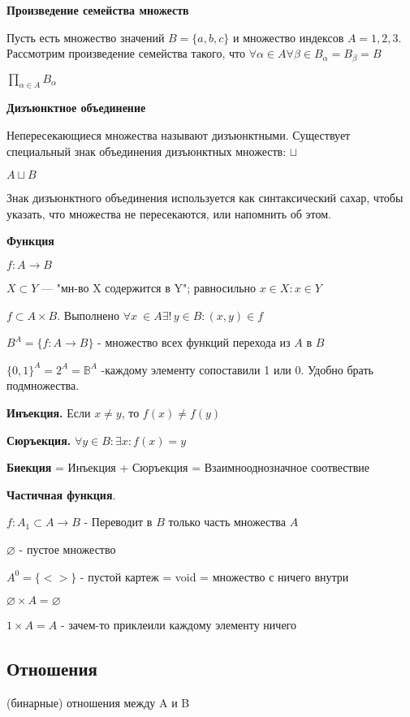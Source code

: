 \textbf{Произведение семейства множеств}

Пусть есть множество значений $B = \{a, b, c\}$  и множество индексов $A = {1, 2, 3}$. Рассмотрим произведение семейства такого, что $\forall \alpha \in A \forall \beta \in B_\alpha = B_\beta = B$

$\prod_{\alpha\in A}{B_\alpha}$

\textbf{Дизъюнктное объединение}

Непересекающиеся множества называют дизъюнктными. Существует специальный знак объединения дизъюнктных множеств: $\sqcup$ 

$A \sqcup B$

Знак дизъюнктного объединения используется как синтаксический сахар, чтобы указать, что множества не пересекаются, или напомнить об этом.

\textbf{Функция} 

$f:A \rightarrow B$

$X \subset Y$ --- "мн-во X содержится в Y"; равносильно $x \in X: x \in Y$

$f \subset A \times B$. Выполнено $\forall x\ \in A \exists!\,y \in B: (x,y) \in f$

$B^A = \{f:A \rightarrow B\}$ - множество всех функций перехода из $A$ в $B$

$\{0, 1\}^{A}=2^{A}=\mathbb{B}^{A}$ -каждому элементу сопоставили 1 или 0. Удобно брать подмножества.


\textbf{Инъекция.} Если $x \neq y$, то $f(x) \neq f(y)$

\textbf{Сюръекция.} $\forall y \in B: \exists x: f(x)=y$

\textbf{Биекция} = Инъекция + Сюръекция = Взаимнооднозначное соотвествие

\textbf{Частичная функция}. 

$f: A_1 \subset A \rightarrow B$ - Переводит в $B$ только часть множества $A$

$\varnothing$ - пустое множество

$A^0 = \{<>\}$ - пустой картеж = void = множество с ничего внутри

$\varnothing \times A = \varnothing$

$1 \times A = A$ - зачем-то приклеили  каждому элементу ничего

\subsection*{Отношения}

(бинарные) отношения между A и B


